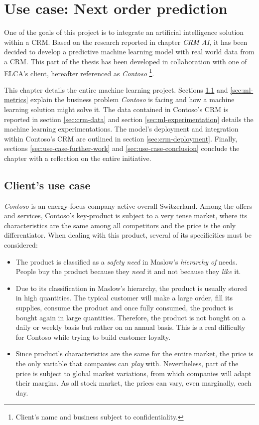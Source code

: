 \chapter{Use case: Next order prediction} \label{chapter:use-case}

One of the goals of this project is to integrate an artificial intelligence solution within a CRM. Based on the research reported in chapter \textit{CRM AI}, it has been decided to develop a predictive machine learning model with real world data from a CRM. This part of the thesis has been developed in collaboration with one of ELCA's client, hereafter referenced as \textit{Contoso} \footnote{Client's name and business subject to confidentiality.}.

This chapter details the entire machine learning project. Sections \ref{sec:use-case} and \ref{sec:ml-metrics} explain the business problem \textit{Contoso} is facing and how a machine learning solution might solve it. The data contained in Contoso's CRM is reported in section \ref{sec:crm-data} and section \ref{sec:ml-experimentation} details the machine learning experimentations. The model's deployment and integration within Contoso's CRM are outlined in section \ref{sec:crm-deployment}. Finally, sections \ref{sec:use-case-further-work} and \ref{sec:use-case-conclusion} conclude the chapter with a reflection on the entire initiative.

\section{Client's use case} \label{sec:use-case}
\textit{Contoso} is an energy-focus company active overall Switzerland. Among the offers and services, Contoso's key-product is subject to a very tense market, where its characteristics are the same among all competitors and the price is the only differentiator. When dealing with this product, several of its specificities must be considered:
\begin{itemize}
\item The product is classified as a \textit{safety need} in Maslow's \textit{hierarchy of }needs\cite{wiki:Maslow's_hierarchy_of_needs}. People buy the product because they \textit{need} it and not because they \textit{like} it.
\item Due to its classification in Maslow's hierarchy, the product is usually stored in high quantities. The typical customer will make a large order, fill its supplies, consume the product and once fully consumed, the product is bought again in large quantities. Therefore, the product is not bought on a daily or weekly basis but rather on an annual basis. This is a real difficulty for Contoso while trying to build customer loyalty.
\item Since product's characteristics are the same for the entire market, the price is the only variable that companies can \textit{play} with. Nevertheless, part of the price is subject to global market variations, from which companies will adapt their margins. As all stock market, the prices can vary, even marginally, each day.
\end{itemize}

